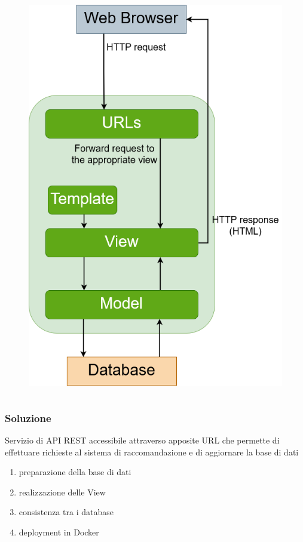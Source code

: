 \begin{frame}
\begin{columns}
\begin{column}{0.5\textwidth}
\begin{figure}
                \includegraphics[scale=0.5]{images/IB_CF_ex}
            \end{figure}
        \end{column}
    \end{columns}
\end{frame}

\begin{frame}
    \frametitle{Soluzione}
    Servizio di \alert{API REST} accessibile attraverso apposite URL che permette di effettuare richieste al sistema di 
    raccomandazione e di aggiornare la base di dati
    \begin{enumerate}
        \item preparazione della base di dati
        \item realizzazione delle View
        \item consistenza tra i database
        \item deployment in Docker
    \end{enumerate}
\end{frame}

